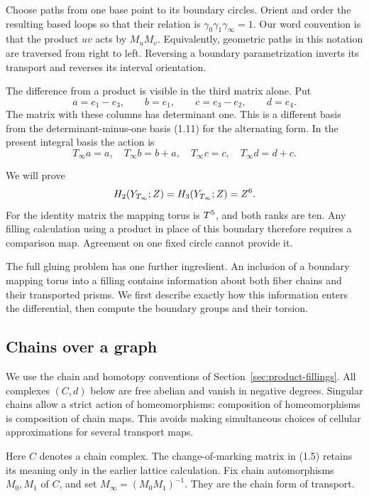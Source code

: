 Choose paths from one base
point to its boundary circles. Orient and order the resulting based
loops so that their relation is $\gamma_0\gamma_1\gamma_\infty=1$.
Our word convention is that the product $uv$ acts by $M_uM_v$.
Equivalently, geometric paths in this notation are traversed from
right to left. Reversing a boundary parametrization inverts its
transport and reverses its interval orientation.

The difference from a product is visible in the third matrix alone.
Put
\begin{equation}\label{ntg:eq:shear-basis}
 a=e_1-e_3,\qquad b=e_1,\qquad c=e_3-e_2,\qquad d=e_4.
\end{equation}
The matrix with these columns has determinant one. This is a different
basis from the determinant-minus-one basis (1.11) for the alternating
form. In the present integral basis the action is
\begin{equation}\label{ntg:eq:shear}
 T_\infty a=a,\quad T_\infty b=b+a,\quad
 T_\infty c=c,\quad T_\infty d=d+c.
\end{equation}

We will prove
\[
 H_2(Y_{T_\infty};Z)=H_3(Y_{T_\infty};Z)=Z^6.
\]
For the identity matrix the mapping torus is $T^5$, and both ranks
are ten. Any filling calculation using a product in place of this
boundary therefore requires a comparison map. Agreement on one fixed
circle cannot provide it.

The full gluing problem has one further ingredient. An inclusion of a
boundary mapping torus into a filling contains information about both
fiber chains and their transported prisms. We first describe exactly
how this information enters the differential, then compute the boundary
groups and their torsion.

\subsection{Chains over a graph}

We use the chain and homotopy conventions of
Section~\ref{sec:product-fillings}. All complexes $(C,d)$ below are
free abelian and vanish in negative degrees. Singular chains allow
a strict action of homeomorphisms: composition
of homeomorphisms is composition of chain maps. This avoids making
simultaneous choices of cellular approximations for several transport
maps.

Here $C$ denotes a chain complex. The change-of-marking matrix in
(1.5) retains its meaning only in the earlier lattice calculation.
Fix chain automorphisms $M_0,M_1$ of $C$, and set
$M_\infty=(M_0M_1)^{-1}$. They are the chain form of transport.


